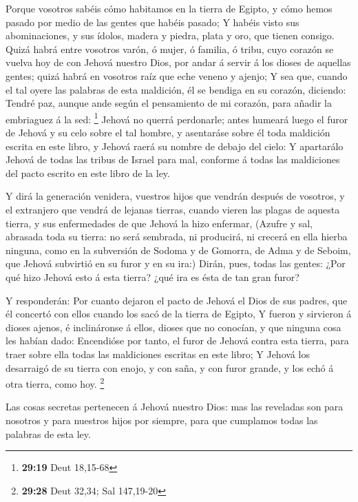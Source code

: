  Porque vosotros sabéis cómo habitamos en la tierra de
Egipto, y cómo hemos pasado por medio de las gentes que habéis pasado;
 Y habéis visto sus abominaciones, y sus ídolos, madera y
piedra, plata y oro, que tienen consigo.  Quizá habrá entre
vosotros varón, ó mujer, ó familia, ó tribu, cuyo corazón se vuelva hoy
de con Jehová nuestro Dios, por andar á servir á los dioses de aquellas
gentes; quizá habrá en vosotros raíz que eche veneno y ajenjo;
 Y sea que, cuando el tal oyere las palabras de esta
maldición, él se bendiga en su corazón, diciendo: Tendré paz, aunque
ande según el pensamiento de mi corazón, para añadir la embriaguez á la
sed: \footnote{\textbf{29:19} Deut 18,15-68}  Jehová no
querrá perdonarle; antes humeará luego el furor de Jehová y su celo
sobre el tal hombre, y asentaráse sobre él toda maldición escrita en
este libro, y Jehová raerá su nombre de debajo del cielo: 
Y apartarálo Jehová de todas las tribus de Israel para mal, conforme á
todas las maldiciones del pacto escrito en este libro de la ley.

 Y dirá la generación venidera, vuestros hijos que vendrán
después de vosotros, y el extranjero que vendrá de lejanas tierras,
cuando vieren las plagas de aquesta tierra, y sus enfermedades de que
Jehová la hizo enfermar,  (Azufre y sal, abrasada toda su
tierra: no será sembrada, ni producirá, ni crecerá en ella hierba
ninguna, como en la subversión de Sodoma y de Gomorra, de Adma y de
Seboim, que Jehová subvirtió en su furor y en su ira:) 
Dirán, pues, todas las gentes: ¿Por qué hizo Jehová esto á esta tierra?
¿qué ira es ésta de tan gran furor?

 Y responderán: Por cuanto dejaron el pacto de Jehová el
Dios de sus padres, que él concertó con ellos cuando los sacó de la
tierra de Egipto,  Y fueron y sirvieron á dioses ajenos, é
inclináronse á ellos, dioses que no conocían, y que ninguna cosa les
habían dado:  Encendióse por tanto, el furor de Jehová
contra esta tierra, para traer sobre ella todas las maldiciones escritas
en este libro;  Y Jehová los desarraigó de su tierra con
enojo, y con saña, y con furor grande, y los echó á otra tierra, como
hoy. \footnote{\textbf{29:28} Deut 32,34; Sal 147,19-20}

 Las cosas secretas pertenecen á Jehová nuestro Dios: mas
las reveladas son para nosotros y para nuestros hijos por siempre, para
que cumplamos todas las palabras de esta ley.

